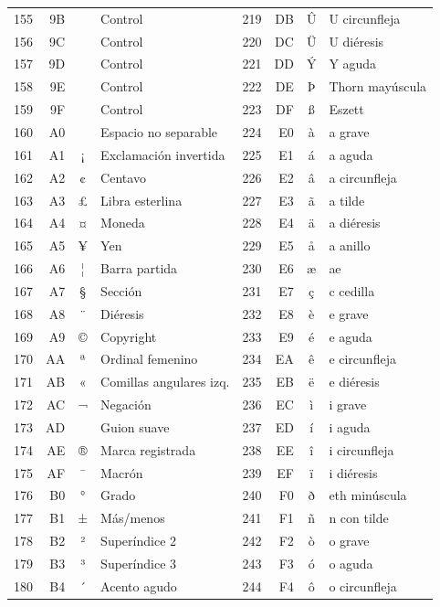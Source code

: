 \documentclass[12pt,twoside]{book}
\begin{document}
\begin{longtable}{r r c l r r c l}
						155 & 9B &  & Control & 219 & DB & Û & U circunfleja \\
						156 & 9C &  & Control & 220 & DC & Ü & U diéresis \\
						157 & 9D &  & Control & 221 & DD & Ý & Y aguda \\
						158 & 9E &  & Control & 222 & DE & Þ & Thorn mayúscula \\
						159 & 9F &  & Control & 223 & DF & ß & Eszett \\
						160 & A0 & ~ & Espacio no separable & 224 & E0 & à & a grave \\
						161 & A1 & ¡ & Exclamación invertida & 225 & E1 & á & a aguda \\
						162 & A2 & ¢ & Centavo & 226 & E2 & â & a circunfleja \\
						163 & A3 & £ & Libra esterlina & 227 & E3 & ã & a tilde \\
						164 & A4 & ¤ & Moneda & 228 & E4 & ä & a diéresis \\
						165 & A5 & ¥ & Yen & 229 & E5 & å & a anillo \\
						166 & A6 & ¦ & Barra partida & 230 & E6 & æ & ae \\
						167 & A7 & § & Sección & 231 & E7 & ç & c cedilla \\
						168 & A8 & ¨ & Diéresis & 232 & E8 & è & e grave \\
						169 & A9 & © & Copyright & 233 & E9 & é & e aguda \\
						170 & AA & ª & Ordinal femenino & 234 & EA & ê & e circunfleja \\
						171 & AB & « & Comillas angulares izq. & 235 & EB & ë & e diéresis \\
						172 & AC & ¬ & Negación & 236 & EC & ì & i grave \\
						173 & AD & ­ & Guion suave & 237 & ED & í & i aguda \\
						174 & AE & ® & Marca registrada & 238 & EE & î & i circunfleja \\
						175 & AF & ¯ & Macrón & 239 & EF & ï & i diéresis \\
						176 & B0 & ° & Grado & 240 & F0 & ð & eth minúscula \\
						177 & B1 & ± & Más/menos & 241 & F1 & ñ & n con tilde \\
						178 & B2 & ² & Superíndice 2 & 242 & F2 & ò & o grave \\
						179 & B3 & ³ & Superíndice 3 & 243 & F3 & ó & o aguda \\
						180 & B4 & ´ & Acento agudo & 244 & F4 & ô & o circunfleja \\

\end{longtable}
\end{document}
